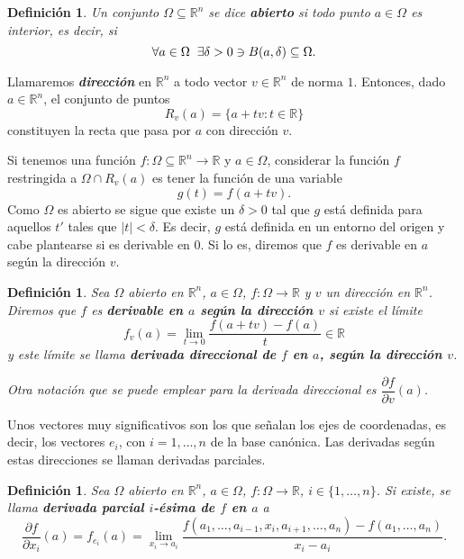 \documentclass[12pt]{article}
\newtheorem{definition}[theorem]{Definición}
\begin{document}
\begin{definition}Un conjunto $\Omega \subseteq \mathbb{R}^n$ se dice \textbf{abierto} si todo punto $a \in \Omega$ es interior, es decir, si $$\forall a \in \Omega \hspace{0.2cm} \exists \delta > 0 \ni B(a,\delta) \subseteq \Omega.$$
\end{definition}

Llamaremos \textbf{\textit{dirección}} en $\mathbb{R}^n$ a todo vector $v \in \mathbb{R}^n$ de norma $1$. Entonces, dado $a \in \mathbb{R}^n$, el conjunto de puntos $$R_v(a)= \lbrace a +tv :t \in \mathbb{R} \rbrace$$ constituyen la recta que pasa por $a$ con dirección $v$.

Si tenemos una función $f: \Omega \subseteq \mathbb{R}^n \longrightarrow \mathbb{R}$ y $a \in \Omega$, considerar la función $f$ restringida a $\Omega \cap R_v(a)$ es tener la función de una variable $$g(t) = f(a+tv).$$ Como $\Omega$ es abierto se sigue que existe un $\delta >0$ tal que $g$ está definida para aquellos $t'$ tales que $|t|<\delta$. Es decir, $g$ está definida en un entorno del origen y cabe plantearse si es derivable en $0$. Si lo es, diremos que $f$ es derivable en $a$ según la dirección $v$. 

\begin{definition}Sea $\Omega$ abierto en $\mathbb{R}^n$, $a \in \Omega$, $f\colon \Omega \longrightarrow \mathbb{R}$ y $v$ un dirección en $\mathbb{R}^n$. Diremos que $f$ es \textbf{derivable en $a$ según la dirección $v$} si existe el límite $$f_v(a) = \lim_{t\rightarrow 0}\dfrac{f(a+tv)-f(a)}{t}\in \mathbb{R}$$ y este límite se llama \textbf{derivada direccional de $f$ en $a$, según la dirección $v$}.

Otra notación que se puede emplear para la derivada direccional es $\dfrac{\partial f}{\partial v}(a)$.
\end{definition}

Unos vectores muy significativos son los que señalan los ejes de coordenadas, es decir, los vectores $e_i$, con $i = 1, \ldots, n$ de la base canónica. Las derivadas según estas direcciones se llaman derivadas parciales.

\begin{definition}Sea $\Omega$ abierto en $\mathbb{R}^n$, $a \in \Omega$, $f\colon \Omega \longrightarrow \mathbb{R}$, $i \in \lbrace 1, \ldots, n \rbrace$. Si existe, se llama \textbf{derivada parcial $i$-ésima de $f$ en $a$} a $$\dfrac{\partial f}{\partial x_i}(a) = f_{e_i}(a) = \lim_{x_i\rightarrow a_i}\dfrac{f(a_1, \ldots, a_{i-1}, x_i, a_{i+1}, \ldots, a_n)-f(a_1, \ldots, a_n)}{x_i-a_i}.$$
\end{definition}
\end{document}

